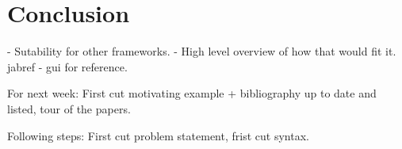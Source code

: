 \section{Conclusion}
- Sutability for other frameworks. - High level overview of how that would fit it.
jabref - gui for reference.

For next week:
First cut motivating example + bibliography up to date and listed, tour of the papers.

Following steps: First cut problem statement, frist cut syntax.

